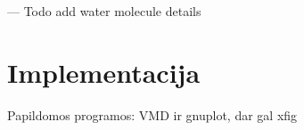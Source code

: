 \documentclass[a4paper,12pt,fleqn,tikz]{article}
\begin{document}
    --- Todo add water molecule details


    \newpage
    \section{Implementacija}
    \label{sec:algorithm_implementation}
    Papildomos programos: VMD ir gnuplot, dar gal xfig


    \label{sec:implementation}
    



    


\end{document}
